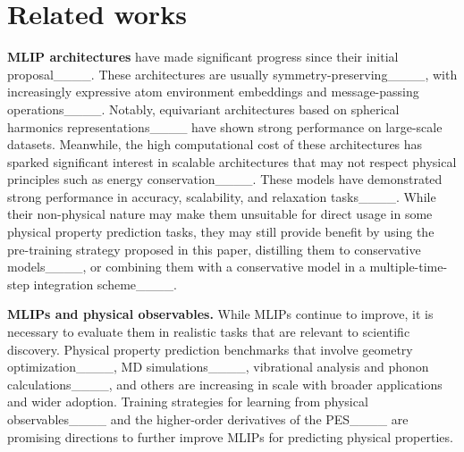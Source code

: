 \section{Related works}
\textbf{MLIP architectures} have made significant progress since their initial proposal____. These architectures are usually symmetry-preserving____, with increasingly expressive atom environment embeddings and message-passing operations____. Notably, equivariant architectures based on spherical harmonics representations____ have shown strong performance on large-scale datasets. Meanwhile, the high computational cost of these architectures has sparked significant interest in scalable architectures that may not respect physical principles such as energy conservation____. These models have demonstrated strong performance in accuracy, scalability, and relaxation tasks____. While their non-physical nature may make them unsuitable for direct usage in some physical property prediction tasks, they may still provide benefit by using the pre-training strategy proposed in this paper, distilling them to conservative models____, or combining them with a conservative model in a multiple-time-step integration scheme____. 

\textbf{MLIPs and physical observables.} While MLIPs continue to improve, it is necessary to evaluate them in realistic tasks that are relevant to scientific discovery. Physical property prediction benchmarks that involve geometry optimization____, MD simulations____, vibrational analysis and phonon calculations____, and others are increasing in scale with broader applications and wider adoption. Training strategies for learning from physical observables____ and the higher-order derivatives of the PES____ are promising directions to further improve MLIPs for predicting physical properties.